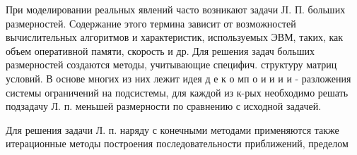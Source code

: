 \documentclass[10pt]{article}
\begin{document}
При моделировании реальных явлений часто возникают задачи ЈI. П. больших размерностей. Содержание этого термина зависит от возможностей вычислительных алгоритмов и характеристик, используемых ЭВМ, таких, как объем оперативной памяти, скорость и др. Для решения задач больших размерностей создаются методы, учитывающие специфич. структуру матриц условий. В основе многих из них лежит идея д е к о мп о и и и и - разложения системы ограничений на подсистемы, для каждой из к-рых необходимо решать подзадачу Л. п. меньшей размерности по сравнению с исходной задачей.



Для решения задачи Л. п. наряду с конечными методами применяются также итерационные методы построения последовательности приближений, пределом
\end{document}
